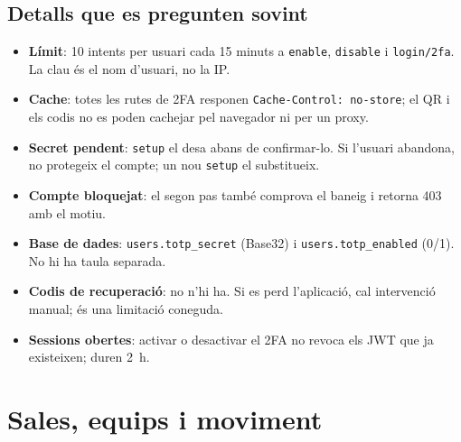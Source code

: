 \documentclass[10pt,a4paper]{article}
\begin{document}
\subsection*{Detalls que es pregunten sovint}

\begin{itemize}[nosep]
  \item \textbf{Límit}: 10 intents per usuari cada 15 minuts a \texttt{enable},
        \texttt{disable} i \texttt{login/2fa}. La clau és el nom d'usuari, no la IP.
  \item \textbf{Cache}: totes les rutes de 2FA responen
        \texttt{Cache-Control: no-store}; el QR i els codis no es poden cachejar pel
        navegador ni per un proxy.
  \item \textbf{Secret pendent}: \texttt{setup} el desa abans de confirmar-lo. Si
        l'usuari abandona, no protegeix el compte; un nou \texttt{setup} el
        substitueix.
  \item \textbf{Compte bloquejat}: el segon pas també comprova el baneig i retorna
        403 amb el motiu.
  \item \textbf{Base de dades}: \texttt{users.totp\_secret} (Base32) i
        \texttt{users.totp\_enabled} (0/1). No hi ha taula separada.
  \item \textbf{Codis de recuperació}: no n'hi ha. Si es perd l'aplicació, cal
        intervenció manual; és una limitació coneguda.
  \item \textbf{Sessions obertes}: activar o desactivar el 2FA no revoca els JWT que ja
        existeixen; duren 2~h.
\end{itemize}

\section{Sales, equips i moviment}
\end{document}
